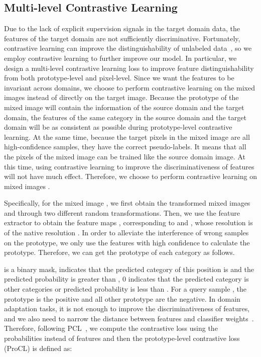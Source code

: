 \documentclass[sigconf]{acmart}
\begin{document}
\subsection{Multi-level Contrastive Learning}
		\label{mcl}
		Due to the lack of explicit supervision signals in the target domain data, the features of the target domain are not sufficiently discriminative. Fortunately, contrastive learning can improve the distinguishability of unlabeled data~\cite{chen2020simple, he2020momentum, grill2020bootstrap, caron2020unsupervised}, so we employ contrastive learning to further improve our model.
In particular, we design a multi-level contrastive learning loss to improve feature distinguishability from both prototype-level and pixel-level. Since we want the features to be invariant across domains, we choose to perform contrastive learning on the mixed images instead of directly on the target image. Because the prototype of the mixed image will contain the information of the source domain and the target domain, the features of the same category in the source domain and the target domain will be as consistent as possible during prototype-level 
		contrastive learning. At the same time, because the target pixels in the mixed image  are all high-confidence samples, they have the correct pseudo-labels. 
		It means that all the pixels of the mixed image  can be trained like the source domain image. At this time, using contrastive learning to improve the discriminativeness of features will not have much effect.  Therefore, we choose to perform contrastive learning on mixed images .
		
		
		Specifically, for the mixed image , we first obtain the transformed mixed images  and  through two different random transformations. Then, we use the feature extractor  to obtain the feature maps ,  corresponding to  and , whose resolution  is  of the native resolution .  In order to alleviate the interference of wrong samples on the prototype, we only use the features with high confidence to calculate the prototype. Therefore, we can get the prototype of each category as follows.
		
		
		
		
		 is a binary mask,  indicates that the predicted category of this position is  and the predicted probability is greater than , 0 indicates that the predicted category is other categories or predicted probability is less than . For a query sample , the prototype  is the positive and all other prototype are the negative. In domain adaptation tasks, it is not enough to improve the discriminativeness of features, and we also need to narrow the distance between features and classifier weights~\cite{li2021semantic}. Therefore, following PCL~\cite{li2021semantic}, we compute the contrastive loss using the probabilities instead of features and then the prototype-level contrastive loss (ProCL) is defined as:
\end{document}
